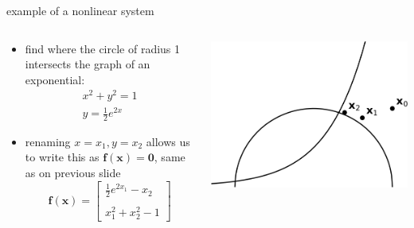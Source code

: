\documentclass[10pt,hyperref]{beamer}
\newcommand{\bbf}{\mathbf{f}}
\newcommand{\bx}{\mathbf{x}}
\newcommand{\bzero}{\bm{0}}
\begin{document}
\begin{frame}{example of a nonlinear system}

\begin{columns}
\begin{column}{0.55\textwidth}
\begin{itemize}
\item find where the circle of radius 1 intersects the graph of an exponential:
\begin{align*}
x^2+y^2 = 1 \\
y = \frac{1}{2} e^{2x}
\end{align*}
\item renaming $x=x_1,y=x_2$ allows us to write this as $\bbf(\bx)=\bzero$, same as on previous slide
  $$\bbf(\bx) = \begin{bmatrix} \frac{1}{2} e^{2x_1} - x_2 \\ \\ x_1^2 + x_2^2 - 1 \end{bmatrix}$$
\end{itemize}
\end{column}
\begin{column}{0.45\textwidth}
\includegraphics[width=\textwidth]{newtonexample.png}
\end{column}
\end{columns}
\end{frame}
\end{document}
